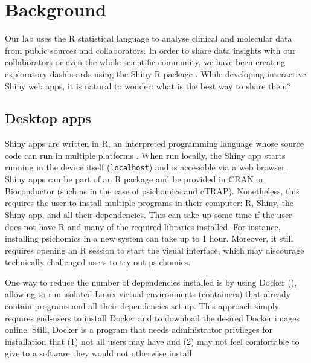 
\section{Background}

Our lab uses the R statistical language to analyse clinical and molecular data from public sources and collaborators. In order to share data insights with our collaborators or even the whole scientific community, we have been creating exploratory dashboards using the Shiny R package \cite{chang:2021ul}. While developing interactive Shiny web apps, it is natural to wonder: what is the best way to share them?

\subsection{Desktop apps}

Shiny apps are written in R, an interpreted programming language whose source code can run in multiple platforms \cite{r-core-team:2021wf,chang:2021ul}. When run locally, the Shiny app starts running in the device itself (\texttt{localhost}) and is accessible via a web browser. Shiny apps can be part of an R package and be provided in CRAN or Bioconductor (such as in the case of psichomics and cTRAP). Nonetheless, this requires the user to install multiple programs in their computer: R, Shiny, the Shiny app, and all their dependencies. This can take up some time if the user does not have R and many of the required libraries installed. For instance, installing psichomics in a new system can take up to 1 hour. Moreover, it still requires opening an R session to start the visual interface, which may discourage technically-challenged users to try out psichomics.


One way to reduce the number of dependencies installed is by using Docker (\mbox{}), allowing to run isolated Linux virtual environments (containers) that already contain programs and all their dependencies set up. This approach simply requires end-users to install Docker and to download the desired Docker images online. Still, Docker is a program that needs administrator privileges for installation that (1) not all users may have and (2) may not feel comfortable to give to a software they would not otherwise install.

